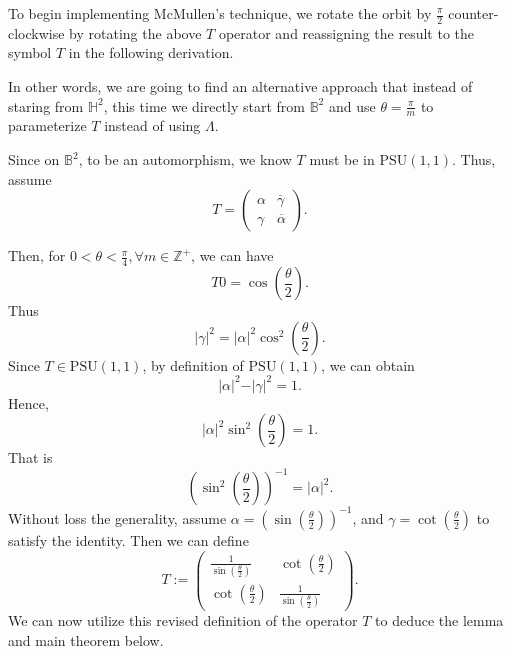 \documentclass[12pt,oneside]{sfsuthesis}
\theoremstyle{plain} %
\newtheorem{lemma}[theorem]{Lemma}
\theoremstyle{definition}  %
\theoremstyle{remark}  %
\theoremstyle{plain}
\begin{document}
{To begin implementing McMullen's technique, we rotate the orbit by $\frac{\pi}{2}$ counter-clockwise by rotating the above $T$ operator and reassigning the result to the symbol $T$ in the following derivation.

In other words, we are going to find an alternative approach that instead of staring from $\mathbb{H}^2$, this time we directly start from $\mathbb{B}^2$ and use $\theta=\frac{\pi}{m}$ to parameterize $T$ instead of using $\Lambda$. 

Since on $\mathbb{B}^2$, to be an automorphism, we know $T$ must be in $\text{PSU}(1,1)$. Thus, assume
$$
T=\begin{pmatrix}
\alpha &  \overline{\gamma} \\
\gamma &  \overline{\alpha}
\end{pmatrix}.
$$

Then, for $0<\theta<\frac{\pi}{4}, \forall m\in\mathbb{Z}^+$, we can have
$$
T0=\cos\left(\frac{\theta}{2}\right).
$$
Thus
$$
\vert \gamma\vert^2=\vert \alpha\vert^2\cos^2\left(\frac{\theta}{2}\right).
$$
Since $T\in\text{PSU}(1,1)$, by definition of $\text{PSU}(1,1)$, we can obtain
$$
\vert \alpha\vert^2-\vert \gamma \vert^2=1.
$$
Hence,
$$
\vert \alpha\vert^2\sin^2\left(\frac{\theta}{2}\right)=1.
$$
That is
$$
\left(\sin^2\left(\frac{\theta}{2}\right) \right)^{-1}=\vert \alpha\vert^2.
$$
Without loss the generality, assume $\alpha=\left(\sin\left(\frac{\theta}{2}\right)\right)^{-1}$, and $\gamma=\cot\left(\frac{\theta}{2}\right)$ to satisfy the identity. 
Then we can define
$$
T:=\begin{pmatrix}
\frac{1}{\sin\left(\frac{\theta}{2}\right)} &  \cot\left(\frac{\theta}{2}\right) \\
\cot\left(\frac{\theta}{2}\right) &  \frac{1}{\sin\left(\frac{\theta}{2}\right)}
\end{pmatrix}.
$$
We can now utilize this revised definition of the operator $T$ to deduce the lemma and main theorem below.


}
\end{document}
